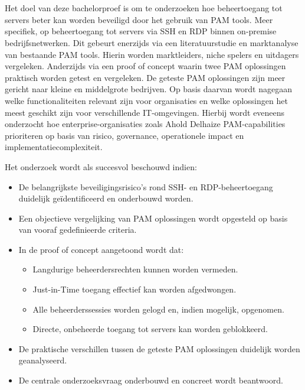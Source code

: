 \section{}%
\label{sec:onderzoeksdoelstelling}

Het doel van deze bachelorproef is om te onderzoeken hoe beheertoegang tot servers beter kan worden beveiligd door het gebruik van PAM tools. Meer specifiek, op beheertoegang tot servers via SSH en RDP binnen on-premise bedrijfsnetwerken. Dit gebeurt enerzijds via een literatuurstudie en marktanalyse van bestaande PAM tools. Hierin worden marktleiders, niche spelers en uitdagers vergeleken.  Anderzijds via een proof of concept waarin twee PAM oplossingen praktisch worden getest en vergeleken. De geteste PAM oplossingen zijn meer gericht naar kleine en middelgrote bedrijven. Op basis daarvan wordt nagegaan welke functionaliteiten relevant zijn voor organisaties en welke oplossingen het meest geschikt zijn voor verschillende IT-omgevingen. Hierbij wordt eveneens onderzocht hoe enterprise-organisaties zoals Ahold Delhaize PAM-capabilities prioriteren op basis van risico, governance, operationele impact en implementatiecomplexiteit.

Het onderzoek wordt als succesvol beschouwd indien:
\begin{itemize}
	\item 	De belangrijkste beveiligingsrisico’s rond SSH- en RDP-beheertoegang duidelijk geïdentificeerd en onderbouwd worden.
	\item	Een objectieve vergelijking van PAM oplossingen wordt opgesteld op basis van vooraf gedefinieerde criteria.
	\item	In de proof of concept aangetoond wordt dat:
	\begin{itemize}	
		\item	Langdurige beheerdersrechten kunnen worden vermeden.
		\item	Just-in-Time toegang effectief kan worden afgedwongen.
		\item	Alle beheerderssessies worden gelogd en, indien mogelijk, opgenomen.
		\item	Directe, onbeheerde toegang tot servers kan worden geblokkeerd.
	\end{itemize}
	\item	De praktische verschillen tussen de geteste PAM oplossingen duidelijk worden geanalyseerd.
	\item	De centrale onderzoeksvraag onderbouwd en concreet wordt beantwoord.
	
	
\end{itemize}

